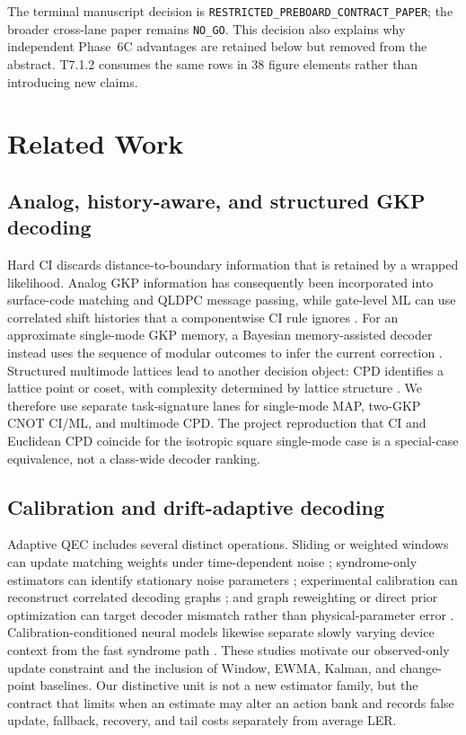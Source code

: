 \documentclass[11pt]{article}
\begin{document}
The terminal manuscript decision is
\texttt{RESTRICTED\_PREBOARD\_CONTRACT\_PAPER}; the broader cross-lane paper
remains \texttt{NO\_GO}.  This decision also explains why independent Phase~6C
advantages are retained below but removed from the abstract.  T7.1.2 consumes
the same rows in 38 figure elements rather than introducing new claims.

\section{Related Work}

\subsection{Analog, history-aware, and structured GKP decoding}

Hard CI discards distance-to-boundary information that is retained by a wrapped
likelihood.  Analog GKP information has consequently been incorporated into
surface-code matching and QLDPC message passing, while gate-level ML can use
correlated shift histories that a componentwise CI rule ignores
\cite{fukui2018,noh2020,noh2022,raveendran2022,berent2024}.  For an approximate
single-mode GKP memory, a Bayesian memory-assisted decoder instead uses the
sequence of modular outcomes to infer the current correction \cite{wan2020}.
Structured multimode lattices lead to another decision object: CPD identifies a
lattice point or coset, with complexity determined by lattice structure
\cite{lin2023}.  We therefore use separate task-signature lanes for single-mode
MAP, two-GKP CNOT CI/ML, and multimode CPD.  The project reproduction that CI
and Euclidean CPD coincide for the isotropic square single-mode case is a
special-case equivalence, not a class-wide decoder ranking.

\subsection{Calibration and drift-adaptive decoding}

Adaptive QEC includes several distinct operations.  Sliding or weighted
windows can update matching weights under time-dependent noise
\cite{spitz2018}; syndrome-only estimators can identify stationary noise
parameters \cite{wagner2021}; experimental calibration can reconstruct
correlated decoding graphs \cite{chen2022}; and graph reweighting or direct
prior optimization can target decoder mismatch rather than physical-parameter
error \cite{dgr2023,sivak2024}.  Calibration-conditioned neural models likewise
separate slowly varying device context from the fast syndrome path
\cite{stein2026}.  These studies motivate our observed-only update constraint
and the inclusion of Window, EWMA, Kalman, and change-point baselines.  Our
distinctive unit is not a new estimator family, but the contract that limits
when an estimate may alter an action bank and records false update, fallback,
recovery, and tail costs separately from average LER.
\end{document}
